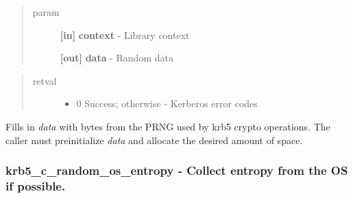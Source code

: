 \documentclass[letterpaper,10pt,english]{sphinxmanual}
\begin{document}
\begin{quote}\begin{description}
\item[{param}] \leavevmode
\textbf{{[}in{]}} \textbf{context} - Library context

\textbf{{[}out{]}} \textbf{data} - Random data

\end{description}\end{quote}
\begin{quote}\begin{description}
\item[{retval}] \leavevmode\begin{itemize}
\item {} 
0   Success; otherwise - Kerberos error codes

\end{itemize}

\end{description}\end{quote}

Fills in \emph{data} with bytes from the PRNG used by krb5 crypto operations. The caller must preinitialize \emph{data} and allocate the desired amount of space.


\subsubsection{krb5\_c\_random\_os\_entropy -  Collect entropy from the OS if possible.}
\label{appdev/refs/api/krb5_c_random_os_entropy:krb5-c-random-os-entropy-collect-entropy-from-the-os-if-possible}\label{appdev/refs/api/krb5_c_random_os_entropy::doc}

\begin{fulllineitems}
\label{appdev/refs/api/krb5_c_random_os_entropy:c.krb5_c_random_os_entropy}
\end{fulllineitems}
\end{document}
